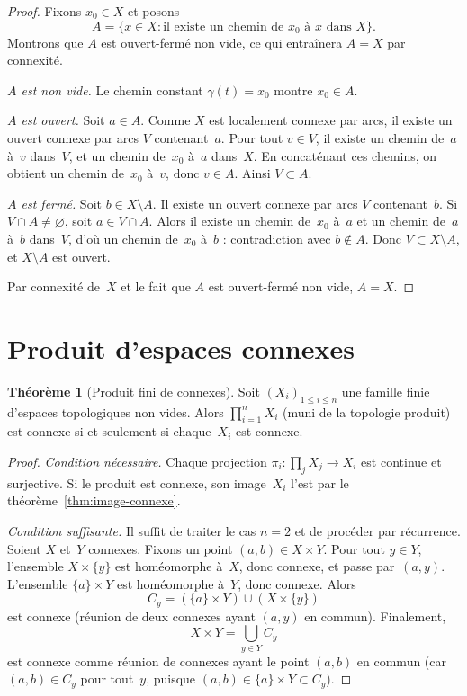 \documentclass[12pt,a4paper,openany]{book}
\theoremstyle{definition}
\theoremstyle{cours}
\newtheorem{theoreme}{Théorème}[chapter]
\theoremstyle{coursnormal}
\begin{document}
\begin{proof}
Fixons $x_0 \in X$ et posons
\[
A = \{ x \in X : \text{il existe un chemin de } x_0 \text{ à } x \text{ dans } X \}.
\]
Montrons que $A$ est ouvert-fermé non vide, ce qui entraînera $A = X$ par connexité.

\noindent\emph{$A$ est non vide.} Le chemin constant $\gamma(t) = x_0$ montre
$x_0 \in A$.

\noindent\emph{$A$ est ouvert.} Soit $a \in A$. Comme $X$ est localement connexe
par arcs, il existe un ouvert connexe par arcs $V$ contenant~$a$. Pour tout
$v \in V$, il existe un chemin de~$a$ à~$v$ dans~$V$, et un chemin de~$x_0$ à~$a$
dans~$X$. En concaténant ces chemins, on obtient un chemin de~$x_0$ à~$v$, donc
$v \in A$. Ainsi $V \subset A$.

\noindent\emph{$A$ est fermé.} Soit $b \in X \setminus A$. Il existe un ouvert
connexe par arcs $V$ contenant~$b$. Si $V \cap A \neq \varnothing$, soit $a \in V \cap A$.
Alors il existe un chemin de~$x_0$ à~$a$ et un chemin de~$a$ à~$b$ dans~$V$, d'où
un chemin de~$x_0$ à~$b$ : contradiction avec $b \notin A$. Donc
$V \subset X \setminus A$, et $X \setminus A$ est ouvert.

Par connexité de~$X$ et le fait que $A$ est ouvert-fermé non vide, $A = X$.
\end{proof}

\section{Produit d'espaces connexes}
\label{sec:produit-connexes}

\begin{theoreme}[Produit fini de connexes]
\label{thm:produit-connexes}
Soit $(X_i)_{1 \leqslant i \leqslant n}$ une famille finie d'espaces topologiques
non vides. Alors $\prod_{i=1}^{n} X_i$ (muni de la topologie produit) est connexe
si et seulement si chaque~$X_i$ est connexe.
\end{theoreme}

\begin{proof}
\emph{Condition nécessaire.} Chaque projection
$\pi_i \colon \prod_{j} X_j \to X_i$ est continue et surjective. Si le produit est
connexe, son image~$X_i$ l'est par le théorème~\ref{thm:image-connexe}.

\emph{Condition suffisante.} Il suffit de traiter le cas $n = 2$ et de procéder par
récurrence. Soient $X$ et~$Y$ connexes. Fixons un point $(a,b) \in X \times Y$.
Pour tout $y \in Y$, l'ensemble $X \times \{y\}$ est homéomorphe à~$X$, donc
connexe, et passe par~$(a,y)$. L'ensemble $\{a\} \times Y$ est homéomorphe à~$Y$,
donc connexe. Alors
\[
C_y = (\{a\} \times Y) \cup (X \times \{y\})
\]
est connexe (réunion de deux connexes ayant $(a,y)$ en commun). Finalement,
\[
X \times Y = \bigcup_{y \in Y} C_y
\]
est connexe comme réunion de connexes ayant le point $(a,b)$ en commun
(car $(a,b) \in C_y$ pour tout~$y$, puisque $(a,b) \in \{a\} \times Y \subset C_y$).
\end{proof}
\end{document}
